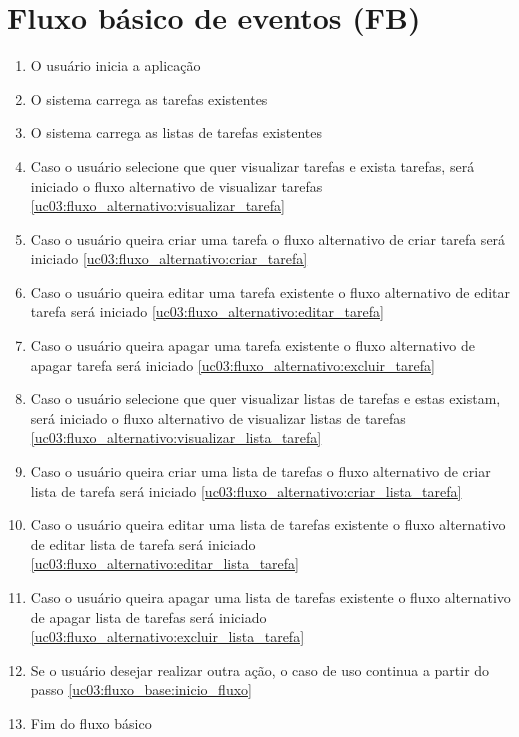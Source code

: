 \documentclass[
	12pt,				%
	oneside,			%
	a4paper,			%
	english,			%
	brazil,				%
	]{abntex2}
\begin{document}
\section{Fluxo básico de eventos (FB)}

\begin{enumerate}
    \item O usuário inicia a aplicação
    \item O sistema carrega as tarefas existentes
    \item O sistema carrega as listas de tarefas existentes
    \label{uc03:fluxo_base:inicio_fluxo}
    \item Caso o usuário selecione que quer visualizar tarefas e exista tarefas, será iniciado o fluxo alternativo de visualizar tarefas \ref{uc03:fluxo_alternativo:visualizar_tarefa}
    \item Caso o usuário queira criar uma tarefa o fluxo alternativo de criar tarefa será iniciado \ref{uc03:fluxo_alternativo:criar_tarefa} \label{uc03:fluxo_base:inicio_opcoes}
    \item Caso o usuário queira editar uma tarefa existente o fluxo alternativo de editar tarefa será iniciado \ref{uc03:fluxo_alternativo:editar_tarefa}
    \item Caso o usuário queira apagar uma tarefa existente o fluxo alternativo de apagar tarefa será iniciado \ref{uc03:fluxo_alternativo:excluir_tarefa}
    
    \item Caso o usuário selecione que quer visualizar listas de tarefas e estas existam, será iniciado o fluxo alternativo de visualizar listas de tarefas \ref{uc03:fluxo_alternativo:visualizar_lista_tarefa}
    \item Caso o usuário queira criar uma lista de tarefas o fluxo alternativo de criar lista de tarefa será iniciado \ref{uc03:fluxo_alternativo:criar_lista_tarefa}
    \item Caso o usuário queira editar uma lista de tarefas existente o fluxo alternativo de editar lista de tarefa será iniciado \ref{uc03:fluxo_alternativo:editar_lista_tarefa}
    \item Caso o usuário queira apagar uma lista de tarefas existente o fluxo alternativo de apagar lista de tarefas será iniciado \ref{uc03:fluxo_alternativo:excluir_lista_tarefa}
    
    \item Se o usuário desejar realizar outra ação, o caso de uso continua a partir do passo \ref{uc03:fluxo_base:inicio_fluxo}
    \item Fim do fluxo básico
\end{enumerate}
\end{document}
